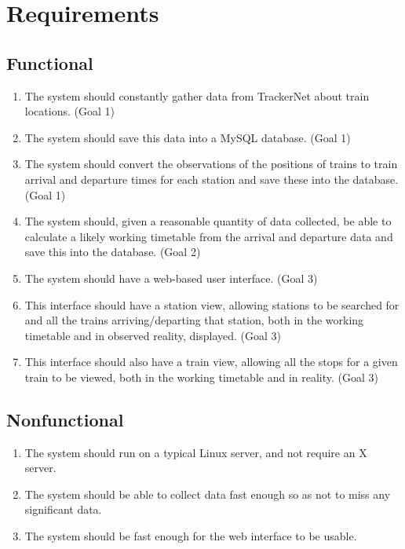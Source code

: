 \documentclass[a4paper,12pt,twoside]{report}
\begin{document}
\chapter{Requirements}

\section{Functional}

\begin{enumerate}
  \item The system should constantly gather data from TrackerNet about train
    locations. (Goal 1)
  \item The system should save this data into a MySQL database. (Goal 1)
  \item The system should convert the observations of the positions of trains
    to train arrival and departure times for each station and save these into
    the database. (Goal 1)
  \item The system should, given a reasonable quantity of data collected, be
    able to calculate a likely working timetable from the arrival and departure
    data and save this into the database. (Goal 2)
  \item The system should have a web-based user interface. (Goal 3)
  \item This interface should have a station view, allowing stations to be
    searched for and all the trains arriving/departing that station, both in
    the working timetable and in observed reality, displayed. (Goal 3)
  \item This interface should also have a train view, allowing all the stops
    for a given train to be viewed, both in the working timetable and in
    reality. (Goal 3)
\end{enumerate}

\section{Nonfunctional}

\begin{enumerate}
  \item The system should run on a typical Linux server, and not require an X
    server.
  \item The system should be able to collect data fast enough so as not to miss
    any significant data.
  \item The system should be fast enough for the web interface to be usable.
\end{enumerate}
\end{document}

